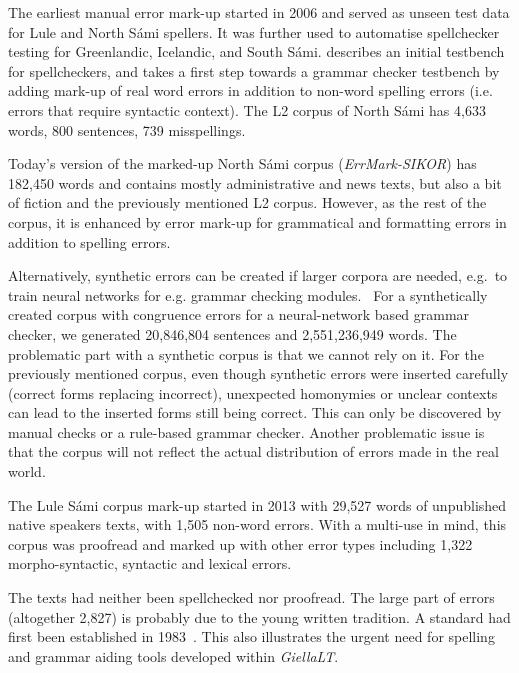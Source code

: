 \documentclass[free]{flammie}
\begin{document}
The earliest manual error mark-up started in 2006 and served as unseen test data
for Lule and North Sámi spellers.  It was further used to automatise
spellchecker testing for Greenlandic, Icelandic, and South Sámi.
\cite{Moshagen2008language} describes an initial testbench for spellcheckers, and
\cite{Antonsen2012improving} takes a first step towards a grammar checker testbench by
adding mark-up of real word errors in addition to non-word spelling errors (i.e.
errors that require syntactic context).  The L2 corpus of North Sámi has 4,633
words, 800 sentences, 739 misspellings.


Today's version of the marked-up North Sámi corpus (\textit{ErrMark-SIKOR}) has
182,450 words and contains mostly administrative and news texts, but also a bit
of fiction and the previously mentioned L2 corpus. However, as the rest of the
corpus, it is enhanced by error mark-up for grammatical and formatting errors in
addition to spelling errors.




Alternatively, synthetic errors can be created if larger corpora are needed,
e.g.\ to train neural networks for e.g. grammar checking
modules.~\cite{wiechetek-etal-2021-rules} For a synthetically created corpus
with congruence errors for a neural-network based grammar checker, we generated
20,846,804 sentences and 2,551,236,949 words.  The problematic part with a
synthetic corpus is that we cannot rely on it. For the previously mentioned
corpus, even though synthetic errors were inserted carefully (correct forms
replacing incorrect), unexpected homonymies or unclear contexts can lead to the
inserted forms still being correct. This can only be discovered by manual checks
or a rule-based grammar checker.  Another problematic issue is that the corpus
will not reflect the actual distribution of errors made in the real world.







The Lule Sámi corpus mark-up started in 2013 with 29,527 words of unpublished
native speakers texts, with 1,505 non-word errors.  With a multi-use in mind,
this corpus was proofread and marked up with other error types including 1,322
morpho-syntactic, syntactic and lexical errors.



The texts had neither been spellchecked nor proofread. The large part of errors
(altogether 2,827) is probably due to the young written tradition. A standard
had first been established in 1983~\cite{magga1994hvordan}.  This also illustrates the
urgent need for spelling and grammar aiding tools developed within
\textit{GiellaLT}.
\end{document}

